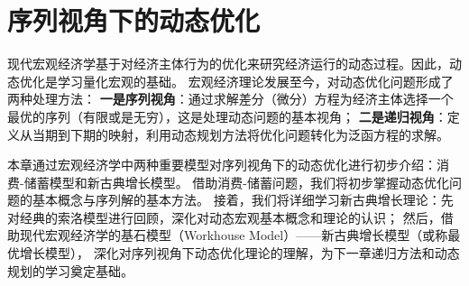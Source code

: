 

\chapter{序列视角下的动态优化} \label{ch-dynamic-opt-sq}

现代宏观经济学基于对经济主体行为的优化来研究经济运行的动态过程。因此，动态优化是学习量化宏观的基础。
宏观经济理论发展至今，对动态优化问题形成了两种处理方法：
\textbf{一是序列视角}：通过求解差分（微分）方程为经济主体选择一个最优的序列（有限或是无穷），这是处理动态问题的基本视角；
\textbf{二是递归视角}：定义从当期到下期的映射，利用动态规划方法将优化问题转化为泛函方程的求解。

本章通过宏观经济学中两种重要模型对序列视角下的动态优化进行初步介绍：消费-储蓄模型和新古典增长模型。
借助消费-储蓄问题，我们将初步掌握动态优化问题的基本概念与序列解的基本方法。
接着，我们将详细学习新古典增长理论：先对经典的索洛模型进行回顾，深化对动态宏观基本概念和理论的认识；
然后，借助现代宏观经济学的基石模型（Workhouse Model）——新古典增长模型（或称最优增长模型），
深化对序列视角下动态优化理论的理解，为下一章递归方法和动态规划的学习奠定基础。












